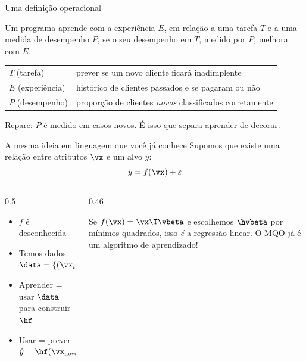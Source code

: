 \documentclass[aspectratio=169,11pt]{beamer}
\begin{document}
\begin{frame}{Uma definição operacional}
  \begin{definicao}
    Um programa \alert{aprende} com a experiência $E$, em relação a uma tarefa
    $T$ e a uma medida de desempenho $P$, se o seu desempenho em $T$, medido
    por $P$, melhora com $E$. \hfill \parencite{mitchell1997}
  \end{definicao}
  \medskip
  \begin{exemplo}[title={Exemplo: concessão de crédito}]
    \begin{tabular}{@{}ll@{}}
      $T$ (tarefa) & prever se um novo cliente ficará inadimplente \\
      $E$ (experiência) & histórico de clientes passados e se pagaram ou não \\
      $P$ (desempenho) & proporção de clientes \emph{novos} classificados corretamente
    \end{tabular}
  \end{exemplo}
  \medskip
  Repare: $P$ é medido em casos \alert{novos}. É isso que separa aprender de decorar.
\end{frame}

\begin{frame}{A mesma ideia em linguagem que você já conhece}
  Supomos que existe uma relação entre atributos $\vx$ e um alvo $y$:
  \[ y = f(\vx) + \varepsilon \]
  \begin{columns}[T]
    \begin{column}{0.5\textwidth}
      \begin{itemize}
        \item $f$ é \alert{desconhecida}
        \item Temos dados $\data = \{(\vx_i, y_i)\}_{i=1}^{n}$
        \item \alert{Aprender} = usar $\data$ para construir $\hf$
        \item \alert{Usar} = prever $\hat y = \hf(\vx_{\text{novo}})$
      \end{itemize}
    \end{column}
    \begin{column}{0.46\textwidth}
      \begin{conexao}
        \small Se $f(\vx) = \vx\T\vbeta$ e escolhemos $\hvbeta$ por mínimos
        quadrados, isso \emph{é} a regressão linear. O MQO já é um algoritmo
        de aprendizado!
      \end{conexao}
    \end{column}
  \end{columns}
\end{frame}
\end{document}
